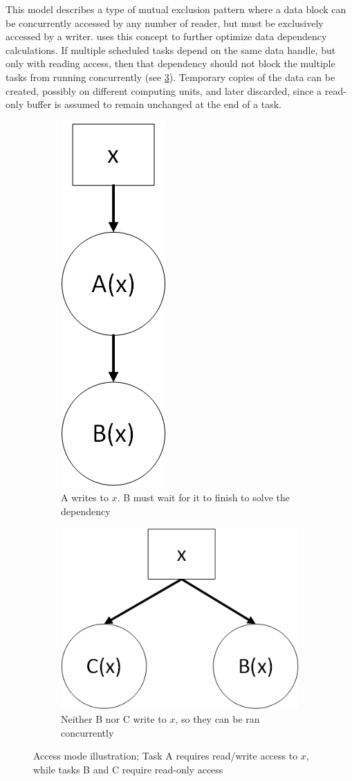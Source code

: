 \documentclass[main.tex]{subfiles}
\begin{document}
This model describes a type of mutual exclusion pattern where a data block can be concurrently accessed by any number of reader, but must be exclusively accessed by a writer. \starpu uses this concept to further optimize data dependency calculations. If multiple scheduled tasks depend on the same data handle, but only with reading access, then that dependency should not block the multiple tasks from running concurrently (see \cref{fig:starpu_dep}). Temporary copies of the data can be created, possibly on different computing units, and later discarded, since a read-only buffer is assumed to remain unchanged at the end of a task.

\begin{figure}[!htp]
  \centering
  \begin{subfigure}[b]{.5\textwidth}
    \centering
    \includegraphics[width=0.2\linewidth]{visio/starpu_dep_rw}
    \caption{A writes to $x$. B must wait for it to finish to solve the dependency \label{fig:starpu_dep_rw}}
  \end{subfigure}%
  \begin{subfigure}[b]{.5\textwidth}
    \centering
    \includegraphics[width=0.6\linewidth]{visio/starpu_dep_r}
    \caption{Neither B nor C write to $x$, so they can be ran concurrently \label{fig:starpu_dep_r}}
  \end{subfigure}
  \caption[\starpu access mode]{Access mode illustration; Task A requires read/write access to $x$, while tasks B and C require read-only access \label{fig:starpu_dep}}
\end{figure}
\end{document}
